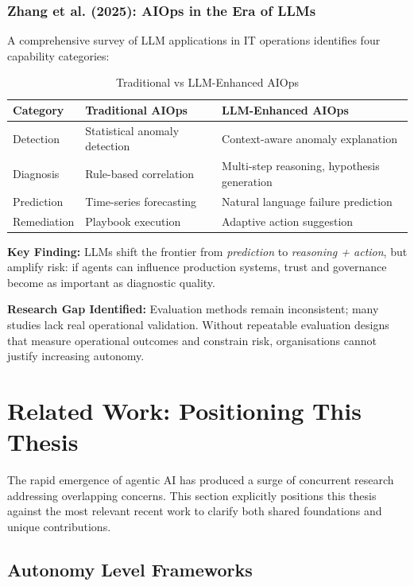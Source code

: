 \subsubsection{Zhang et al. (2025): AIOps in the Era of LLMs}

A comprehensive survey of LLM applications in IT operations identifies four capability categories:

\begin{table}[htbp]
\centering
\caption{Traditional vs LLM-Enhanced AIOps}
\label{tab:aiops-comparison}
\begin{tabular}{lll}
\toprule
\textbf{Category} & \textbf{Traditional AIOps} & \textbf{LLM-Enhanced AIOps} \\
\midrule
Detection & Statistical anomaly detection & Context-aware anomaly explanation \\
Diagnosis & Rule-based correlation & Multi-step reasoning, hypothesis generation \\
Prediction & Time-series forecasting & Natural language failure prediction \\
Remediation & Playbook execution & Adaptive action suggestion \\
\bottomrule
\end{tabular}
\end{table}

\textbf{Key Finding:} LLMs shift the frontier from \textit{prediction} to \textit{reasoning + action}, but amplify risk: if agents can influence production systems, trust and governance become as important as diagnostic quality.

\textbf{Research Gap Identified:} Evaluation methods remain inconsistent; many studies lack real operational validation. Without repeatable evaluation designs that measure operational outcomes and constrain risk, organisations cannot justify increasing autonomy.

\section{Related Work: Positioning This Thesis}
\label{sec:related-work}

The rapid emergence of agentic AI has produced a surge of concurrent research addressing overlapping concerns. This section explicitly positions this thesis against the most relevant recent work to clarify both shared foundations and unique contributions.

\subsection{Autonomy Level Frameworks}
\label{subsec:autonomy-frameworks}

